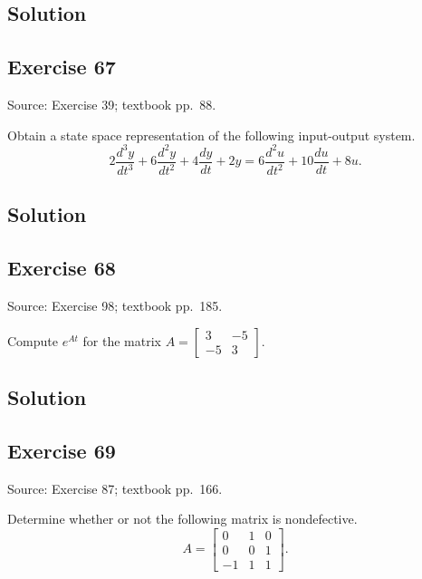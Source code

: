 \documentclass[12pt,a4paper]{article}
\newlength{\questionroom}
\newenvironment{questionprompt}{%
  \begin{lrbox}{\questionbox}\begin{minipage}{\linewidth}%
}{%
  \end{minipage}\end{lrbox}%
  \setlength{\questionroom}{\dimexpr\ht\questionbox+\dp\questionbox+5.2cm\relax}%
  \ifdim\questionroom>\textheight\setlength{\questionroom}{\textheight}\fi
  \Needspace{\questionroom}%
  \noindent\usebox{\questionbox}\par
}
\begin{document}
\subsection*{Solution}
\vspace{3.5cm}


\begin{questionprompt}
\section*{Exercise 67}
\label{practice:67}
{\small Source: Exercise 39; textbook pp.~88.}\par
Obtain a state space representation of the following input-output system.
\[2\frac{d^3y}{dt^3}+6\frac{d^2y}{dt^2}+4\frac{dy}{dt}+2y
=6\frac{d^2u}{dt^2}+10\frac{du}{dt}+8u.\]
\end{questionprompt}
\subsection*{Solution}
\vspace{3.5cm}


\begin{questionprompt}
\section*{Exercise 68}
\label{practice:68}
{\small Source: Exercise 98; textbook pp.~185.}\par
Compute $e^{At}$ for the matrix $A=\begin{bmatrix}3&-5\\-5&3\end{bmatrix}$.
\end{questionprompt}
\subsection*{Solution}
\vspace{3.5cm}


\begin{questionprompt}
\section*{Exercise 69}
\label{practice:69}
{\small Source: Exercise 87; textbook pp.~166.}\par
Determine whether or not the following matrix is nondefective.
\[A=\begin{bmatrix}0&1&0\\0&0&1\\-1&1&1\end{bmatrix}.\]
\end{questionprompt}
\end{document}
